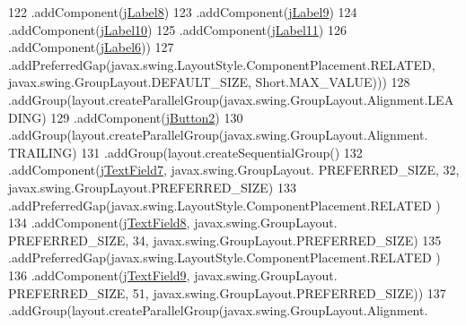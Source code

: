 \begin{DoxyCode}
122                                         .addComponent(\mbox{\hyperlink{class_interfaz_package_1_1_alta_libro_lectura_a04a4898900537bec80bdc4e81d5c41cf}{jLabel8}})
123                                         .addComponent(\mbox{\hyperlink{class_interfaz_package_1_1_alta_libro_lectura_aee8f7c9887d32f72c8bd2e6e9808c524}{jLabel9}})
124                                         .addComponent(\mbox{\hyperlink{class_interfaz_package_1_1_alta_libro_lectura_a1ba04a625fc1945d471079471ff341bf}{jLabel10}})
125                                         .addComponent(\mbox{\hyperlink{class_interfaz_package_1_1_alta_libro_lectura_ada3bdfc583114e6ba88ce12cb9ba9a3f}{jLabel11}})
126                                         .addComponent(\mbox{\hyperlink{class_interfaz_package_1_1_alta_libro_lectura_adad4d61512f9ca3dc3fb3276975ac720}{jLabel6}}))
127                                     .addPreferredGap(javax.swing.LayoutStyle.ComponentPlacement.RELATED, 
      javax.swing.GroupLayout.DEFAULT\_SIZE, Short.MAX\_VALUE)))
128                             .addGroup(layout.createParallelGroup(javax.swing.GroupLayout.Alignment.LEADING)
129                                 .addComponent(\mbox{\hyperlink{class_interfaz_package_1_1_alta_libro_lectura_a10ae90b6c76399e4509186a1b9d80f42}{jButton2}})
130                                 .addGroup(layout.createParallelGroup(javax.swing.GroupLayout.Alignment.
      TRAILING)
131                                     .addGroup(layout.createSequentialGroup()
132                                         .addComponent(\mbox{\hyperlink{class_interfaz_package_1_1_alta_libro_lectura_a36a5981735d729d529ba7e20cb9182da}{jTextField7}}, javax.swing.GroupLayout.
      PREFERRED\_SIZE, 32, javax.swing.GroupLayout.PREFERRED\_SIZE)
133                                         .addPreferredGap(javax.swing.LayoutStyle.ComponentPlacement.RELATED
      )
134                                         .addComponent(\mbox{\hyperlink{class_interfaz_package_1_1_alta_libro_lectura_a3d4c846fbcd44478ef1bb950c38d6f57}{jTextField8}}, javax.swing.GroupLayout.
      PREFERRED\_SIZE, 34, javax.swing.GroupLayout.PREFERRED\_SIZE)
135                                         .addPreferredGap(javax.swing.LayoutStyle.ComponentPlacement.RELATED
      )
136                                         .addComponent(\mbox{\hyperlink{class_interfaz_package_1_1_alta_libro_lectura_aac3e23145bb542e8d96109c1ab458fa1}{jTextField9}}, javax.swing.GroupLayout.
      PREFERRED\_SIZE, 51, javax.swing.GroupLayout.PREFERRED\_SIZE))
137                                     .addGroup(layout.createParallelGroup(javax.swing.GroupLayout.Alignment.

\end{DoxyCode}
